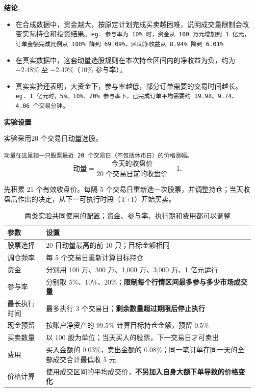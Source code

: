 \documentclass[UTF8,fontset=fandol,11pt,a4paper]{ctexart}
\begin{document}
\noindent\textbf{结论}
\begin{itemize}
    \item 在合成数据中，资金越大，按原定计划完成买卖越困难，说明成交量限制会改变实际持仓和投资结果。\texttt{eg. 参与率为 10\% 时，资金从 100 万元增加到 1 亿元，订单金额完成比例从 100\% 降到 69.09\%，区间净收益从 8.94\% 降到 6.01\%}

    \item 在真实数据中，这套动量选股规则在本次持仓区间内的净收益为负，约为 $-2.48$\% 至 $-2.40$\%（10\% 参与率）。

    \item 真实实验还表明，大资金下，参与率越低，部分订单需要的交易时间越长。\texttt{eg. 1 亿元时，5\%、10\%、20\% 参与率下，已完成订单平均需要约 19.98、9.74、4.06 个交易分钟}。
\end{itemize}
\medskip
\noindent\textbf{实验设置}

实验采用20 个交易日动量选股。


\texttt{动量在这里指一只股票最近 20 个交易日（不包括休市日）的价格涨幅。}
\[
\text{动量}=\frac{\text{今天的收盘价}}{\text{20 个交易日前的收盘价}}-1.
\]


先积累 21 个有效收盘价。每隔 5 个交易日重新选一次股票，并调整持仓；当天收盘后作出的决定，从下一可执行时段（T+1）开始买卖。


\begin{table}[H]\centering\small
\scriptsize
\begin{tabularx}{\linewidth}{p{34mm}Y}
\toprule
参数 & 设置\\
\midrule
股票选择 & 20 日动量最高的前 10 只；目标金额相同\\
调仓频率 & 每 5 个交易日重新计算目标持仓\\
资金 & 分别用 100 万、300 万、1,000 万、3,000 万、1 亿元运行\\
参与率 & 分别取 5\%、10\%、20\%；\textbf{限制每个行情区间最多参与多少市场成交量}\\
最长执行时间 & 最多执行 3 个交易日；\textbf{剩余数量超过期限后停止执行}\\
现金预留 & 按账户净资产的 99.5\% 计算目标持仓金额，预留 0.5\%\\
买卖数量 & 以 100 股为单位；当天买入的股票，下一交易日才可卖出\\
费用 & 买入金额的 0.03\%，卖出金额的 0.08\%；同一笔订单在同一天的全部成交合计最低收 5 元\\
价格计算 & 使用成交区间的平均成交价，\textbf{不另加入自身大额下单导致的价格变化}\\
\bottomrule
\end{tabularx}
\caption{两类实验共同使用的配置；资金、参与率、执行期和费用都可以调整}
\end{table}
\end{document}
